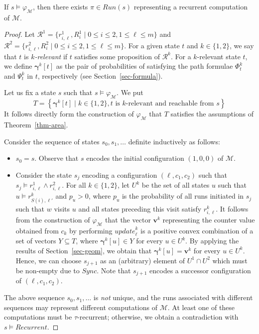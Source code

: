 \documentclass[a4paper,UKenglish,cleveref, autoref, thm-restate]{lipics-v2021}
\newcommand{\M}{\mathcal{M}}
\newcommand{\calR}{\mathcal{R}}
\newcommand{\run}{\textit{Run}}
\renewcommand{\vec}[1]{\pmb{#1}}
\newcommand{\update}{\textit{update}}
\newcommand{\Recurrent}{\textit{Recurrent}}
\newcommand{\Sync}{\textit{Sync}}
\newcommand{\cv}{\vec{\gamma}}
\begin{document}
\begin{proposition}
\label{prop-correct}
    If $s \models \varphi_\M$, then there exists $\pi \in \run(s)$ representing a recurrent computation of $\M$.
\end{proposition}
\begin{proof}
    Let $\calR^1 = \{r^1_{i,\ell},R^1_i \mid 0 \leq i \leq 2, 1 \leq \ell \leq m\}$ and $\calR^2 = \{r^2_{i,\ell},R^2_i \mid 0 \leq i \leq 2, 1 \leq \ell \leq m\}$. For a given state $t$ and $k \in \{1,2\}$, we say that $t$ is \emph{$k$-relevant} if $t$ satisfies some proposition of $\calR^k$. For a $k$-relevant state $t$, we define $\cv^k[t]$ as the pair of probabilities of satisfying the path formulae $\Phi_t^k$ and $\Psi_t^k$ in $t$, respectively (see Section~\ref{sec-formula}).
    
    Let us fix a state $s$ such that $s \models \varphi_\M$.
    We put 
    \[
       T = \left\{\cv^k[t] \mid k \in \{1,2\}, t \mbox{ is $k$-relevant and reachable from $s$}\right\}
    \]
    It follows directly form the construction of $\varphi_\M$ that $T$ satisfies the assumptions of Theorem~\ref{thm-area}. 

    Consider the sequence of states $s_0,s_1,\ldots$ definite inductively as follows:
    \begin{itemize}
        \item $s_0 = s$. Observe that $s$ encodes the initial configuration $(1,0,0)$ of $\M$.
        \item Consider the state $s_j$ encoding a configuration $(\ell,c_1,c_2)$
        such that $s_j \models r^1_{i,\ell} \wedge r^2_{i,\ell}$. For all $k \in \{1,2\}$, let $U^k$ be the set of all states $u$ such that $u \models r^k_{S(i),\ell'}$ and $p_u > 0$, where $p_u$ is the probability of all runs initiated in $s_j$ such that $w$ 
        visits $u$ and all states preceding this visit satisfy $r_{i,\ell}^k$. It follows from the construction of $\varphi_\M$ that the vector $\vec{v}^k$ representing the counter value obtained from $c_k$ by performing $\update_\ell^k$ is a positive convex combination of a set of vectors 
        $Y \subseteq T$, where $\cv^k[u] \in Y$ for every $u \in U^k$. By applying the results of Section~\ref{sec-geom}, we obtain that $\cv^k[u] = \vec{v}^k$ for every $u \in U^k$. Hence, we can choose $s_{j+1}$ as an (arbitrary) element of $U^1 \cap U^2$ which must be non-empty due to $\Sync$. Note that $s_{j+1}$ encodes a successor configuration of $(\ell,c_1,c_2)$.
    \end{itemize}
    The above sequence $s_0,s_1,\ldots$ is \emph{not} unique, and the runs associated with different sequences may represent different computations of $\M$. At least one of these computations must be $\tau$-recurrent; otherwise, we obtain a contradiction with $s \models \Recurrent$. 
\end{proof}
\end{document}
